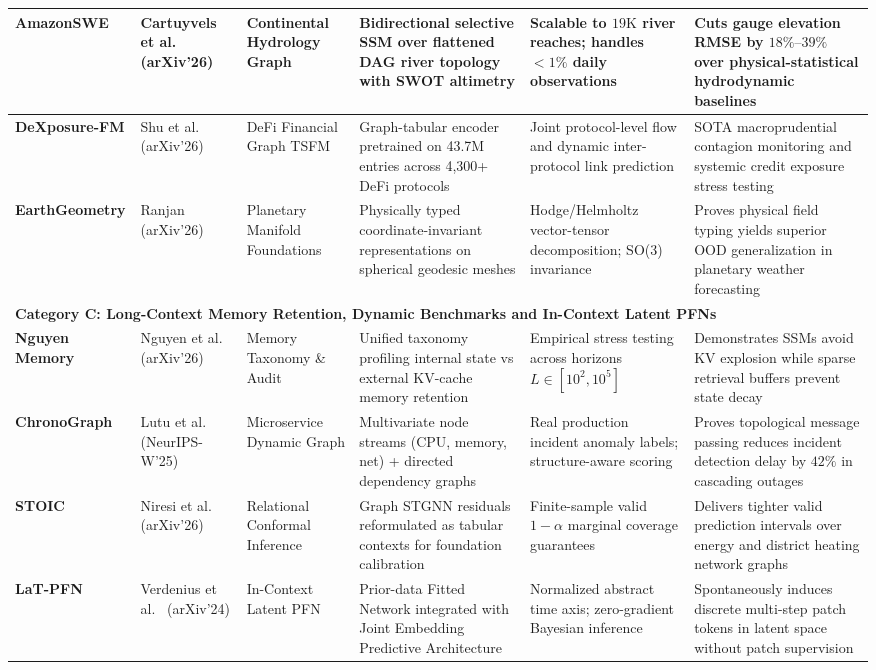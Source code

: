 \begin{table}[t]
{\begin{tabular}{llllll}
\midrule
\textbf{AmazonSWE} & Cartuyvels et al.~\cite{cartuyvels2026hydrology} (arXiv'26) & Continental Hydrology Graph & Bidirectional selective SSM over flattened DAG river topology with SWOT altimetry & Scalable to $19\text{K}$ river reaches; handles $<1\%$ daily observations & Cuts gauge elevation RMSE by $18\%\text{--}39\%$ over physical-statistical hydrodynamic baselines \\
\midrule
\textbf{DeXposure-FM} & Shu et al.~\cite{shu2026dexposure} (arXiv'26) & DeFi Financial Graph TSFM & Graph-tabular encoder pretrained on 43.7M entries across 4,300+ DeFi protocols & Joint protocol-level flow and dynamic inter-protocol link prediction & SOTA macroprudential contagion monitoring and systemic credit exposure stress testing \\
\midrule
\textbf{EarthGeometry} & Ranjan~\cite{ranjan2026earthgeometry} (arXiv'26) & Planetary Manifold Foundations & Physically typed coordinate-invariant representations on spherical geodesic meshes & Hodge/Helmholtz vector-tensor decomposition; SO(3) invariance & Proves physical field typing yields superior OOD generalization in planetary weather forecasting \\
\midrule
\multicolumn{6}{l}{\textbf{Category C: Long-Context Memory Retention, Dynamic Benchmarks and In-Context Latent PFNs}} \\
\midrule
\textbf{Nguyen Memory} & Nguyen et al.~\cite{nguyen2026memory} (arXiv'26) & Memory Taxonomy \& Audit & Unified taxonomy profiling internal state vs external KV-cache memory retention & Empirical stress testing across horizons $L \in [10^2, 10^5]$ & Demonstrates SSMs avoid KV explosion while sparse retrieval buffers prevent state decay \\
\midrule
\textbf{ChronoGraph} & Lutu et al.~\cite{lutu2025chronograph} (NeurIPS-W'25) & Microservice Dynamic Graph & Multivariate node streams (CPU, memory, net) + directed dependency graphs & Real production incident anomaly labels; structure-aware scoring & Proves topological message passing reduces incident detection delay by $42\%$ in cascading outages \\
\midrule
\textbf{STOIC} & Niresi et al.~\cite{niresi2026graphconformal} (arXiv'26) & Relational Conformal Inference & Graph STGNN residuals reformulated as tabular contexts for foundation calibration & Finite-sample valid $1-\alpha$ marginal coverage guarantees & Delivers tighter valid prediction intervals over energy and district heating network graphs \\
\midrule
\textbf{LaT-PFN} & Verdenius et al.~\cite{verdenius2024latpfn} (arXiv'24) & In-Context Latent PFN & Prior-data Fitted Network integrated with Joint Embedding Predictive Architecture & Normalized abstract time axis; zero-gradient Bayesian inference & Spontaneously induces discrete multi-step patch tokens in latent space without patch supervision \\
\bottomrule
\end{tabular}
}
\end{table}

